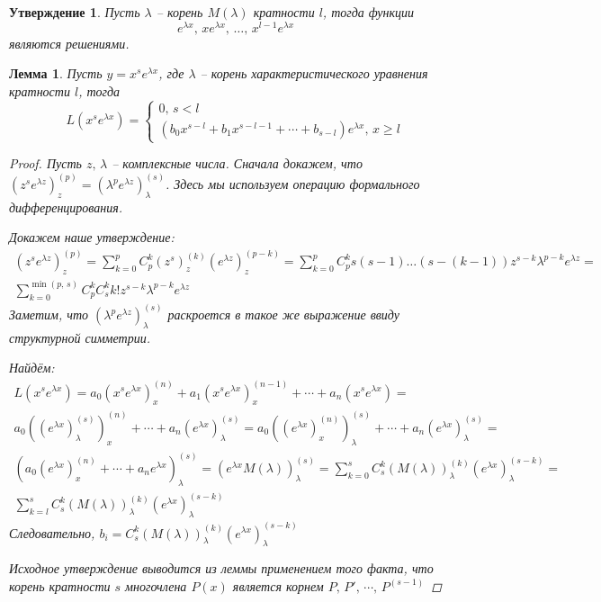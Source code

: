 \documentclass[a4paper,12pt]{article}
\renewcommand{\geq}{\ensuremath{\geqslant}}
\theoremstyle{plain}
\newtheorem{lemma}{Лемма}[section]
\newtheorem{proposition}{Утверждение}[section]
\theoremstyle{definition}
\theoremstyle{remark}
\begin{document}
\begin{proposition}
	Пусть $\lambda$ -- корень $M(\lambda)$ кратности $l$, тогда функции
	\[e^{\lambda x},\, xe^{\lambda x},\,\ldots,\, x^{l - 1}e^{\lambda x}\] являются решениями.
\end{proposition}

\begin{lemma}
	Пусть $y = x^se^{\lambda x}$, где $\lambda$ -- корень характеристического уравнения кратности $l$, тогда
	\[L(x^se^{\lambda x}) = \begin{cases}
			0,\, s < l \\
			(b_0x^{s-l} + b_1x^{s-l-1}+\cdots+b_{s-l})e^{\lambda x},\, x \geq l
		\end{cases}\]

	\begin{proof}
		Пусть $z,\, \lambda$ -- комплексные числа. Сначала докажем, что $(z^se^{\lambda z})^{(p)}_z = (\lambda^pe^{\lambda z})^{(s)}_\lambda$. Здесь мы используем операцию формального дифференцирования.

		Докажем наше утверждение:
		\begin{align*}
			(z^se^{\lambda z})^{(p)}_z = \sum_{k=0}^p C_p^k (z^s)_z^{(k)}(e^{\lambda z})_z^{(p - k)} = \sum_{k = 0}^p C_p^k s(s-1)\ldots(s - (k - 1))z^{s - k}\lambda^{p-k}e^{\lambda z} = \\
			\sum_{k = 0}^{\min(p,\,s)} C_p^k C_s^k k! z^{s - k}\lambda^{p-k}e^{\lambda z}
		\end{align*}
		Заметим, что $(\lambda^pe^{\lambda z})^{(s)}_\lambda$ раскроется в такое же выражение ввиду структурной симметрии.

		Найдём:
		\begin{align*}
			L(x^se^{\lambda x}) = a_0(x^se^{\lambda x})^{(n)}_x + a_1(x^se^{\lambda x})^{(n-1)}_x + \cdots + a_n(x^se^{\lambda x}) =                                                                             \\
			a_0 ((e^{\lambda x})^{(s)}_\lambda)^{(n)}_x + \cdots + a_n (e^{\lambda x})^{(s)}_\lambda = a_0((e^{\lambda x})^{(n)}_x)^{(s)}_\lambda + \cdots + a_n(e^{\lambda x})^{(s)}_\lambda =                  \\
			(a_0(e^{\lambda x})^{(n)}_x + \cdots + a_ne^{\lambda x})^{(s)}_\lambda = (e^{\lambda x}M(\lambda))^{(s)}_\lambda = \sum_{k = 0}^s C_s^k(M(\lambda))_\lambda^{(k)}(e^{\lambda x})^{(s - k)}_\lambda = \\
			\sum_{k = l}^s C_s^k(M(\lambda))_\lambda^{(k)}(e^{\lambda x})^{(s - k)}_\lambda
		\end{align*}
		Следовательно, $b_i = C_s^k(M(\lambda))^{(k)}_\lambda(e^{\lambda x})^{(s-k)}_\lambda$

		Исходное утверждение выводится из леммы применением того факта, что корень кратности $s$ многочлена $P(x)$ является корнем $P,\,P',\,\cdots,\,P^{(s-1)}$
	\end{proof}
\end{lemma}
\end{document}
